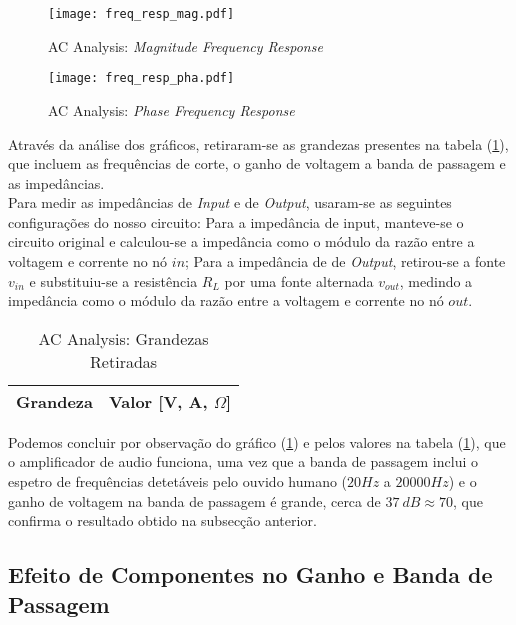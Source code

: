 \begin{figure}[H] \centering
  \texttt{[image: freq\_resp\_mag.pdf]}
  \caption{AC Analysis: \emph{Magnitude Frequency Response}}
  \label{fig:ACASimMag}
\end{figure}

\begin{figure}[H] \centering
  \texttt{[image: freq\_resp\_pha.pdf]}
  \caption{AC Analysis: \emph{Phase Frequency Response}}
  \label{fig:ACASimPha}
\end{figure}

Através da análise dos gráficos, retiraram-se as grandezas presentes na tabela (\ref{tab:ACSimValues}), que
incluem as frequências de corte, o ganho de voltagem a banda de passagem e as impedâncias.
\\
Para medir as impedâncias de \emph{Input} e de \emph{Output}, usaram-se as seguintes configurações do nosso circuito:
Para a impedância de input, manteve-se o circuito original e calculou-se a impedância como o módulo da razão entre
a voltagem e corrente no nó $in$; Para a impedância de de \emph{Output}, retirou-se a fonte $v_{in}$ e substituiu-se
a resistência $R_L$ por uma fonte alternada $v_{out}$, medindo a impedância como o módulo da razão entre a voltagem
e corrente no nó $out$.

\begin{table}[H]
  \centering
  \begin{tabular}{|l|r|}
  \hline    
  {\bf Grandeza} & {\bf Valor [V, A, $\Omega$]} \\ \hline
  
  
  \end{tabular}
  \caption{AC Analysis: Grandezas Retiradas}
  \label{tab:ACSimValues}
\end{table}

Podemos concluir por observação do gráfico (\ref{fig:ACASimMag}) e pelos valores na tabela (\ref{tab:ACSimValues}),
que o amplificador de audio funciona, uma vez que a banda de passagem inclui o espetro de frequências detetáveis
pelo ouvido humano ($20 Hz$ a $20000 Hz$) e o ganho de voltagem na banda de passagem é grande, cerca de $37 \: dB
\approx 70$, que confirma o resultado obtido na subsecção anterior.


\subsection{Efeito de Componentes no Ganho e Banda de Passagem}

